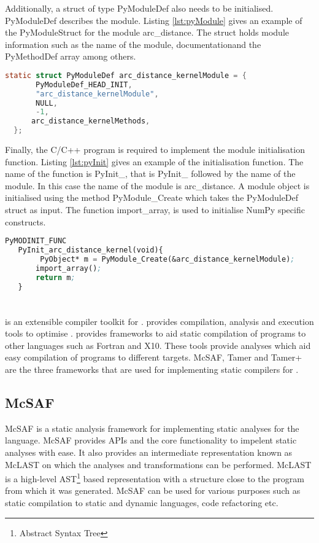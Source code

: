 Additionally, a struct of type PyModuleDef also needs to be initialised. PyModuleDef describes the module. Listing \ref{lst:pyModule} gives an example of the PyModuleStruct for the module arc\_distance. The struct holds module information such as the name of the module, documentationand the PyMethodDef array among others.
\begin{lstlisting}[language=C, label={lst:pyModule}, caption={Example of the PyModuleDef struct}]
 static struct PyModuleDef arc_distance_kernelModule = {
       PyModuleDef_HEAD_INIT,
       "arc_distance_kernelModule",
       NULL,
       -1,
      arc_distance_kernelMethods,
  };
\end{lstlisting}

 Finally, the C/C++ program is required to implement the module initialisation function. Listing \ref{lst:pyInit} gives an example of the initialisation function. The name of the function is PyInit\_<module name>, that is \textsf{PyInit\_} followed by the name of the module. In this case the name of the module is arc\_distance. A module object is initialised using the method PyModule\_Create which takes the PyModuleDef struct as input. The function import\_array, is used to initialise NumPy specific constructs. 
\begin{lstlisting}[language=lisp, label={lst:pyInit}, caption={Example of the module initialisation function for the module arc\_distance}]
 PyMODINIT_FUNC
   PyInit_arc_distance_kernel(void){
        PyObject* m = PyModule_Create(&arc_distance_kernelModule);
       import_array();
       return m;
   }

\end{lstlisting}
\section{\mclab}
\mclab is an extensible compiler toolkit for \matlab. \mclab provides compilation, analysis and execution tools to optimise \matlab. \mclab provides frameworks to aid static compilation of \matlab programs to other languages such as Fortran and X10. These tools provide analyses which aid easy compilation of \matlab programs to different targets. McSAF, Tamer and Tamer+ are the three frameworks that are used for implementing static compilers for \matlab. 
\subsection{McSAF}
McSAF is a static analysis framework for implementing static analyses for the \matlab language. McSAF provides APIs and the core functionality to impelent static analyses with ease. It also provides an intermediate representation known as McLAST on which the analyses and transformations can be performed. McLAST is a high-level AST\footnote{Abstract Syntax Tree} based representation with a structure close to the \matlab program from which it was generated. McSAF can be used for various purposes such as static compilation to static and dynamic languages, code refactoring etc. 

